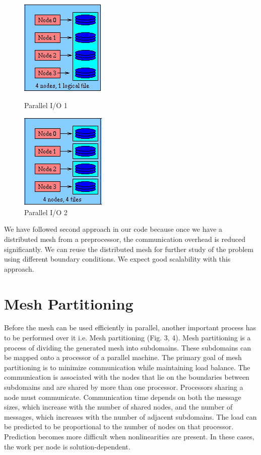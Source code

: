 \documentclass[a4paper, 11pt, oneside]{scrartcl}
\begin{document}
\begin{figure}[!htb]
\centering
{}
\centering
\includegraphics[]{./parallelio_0.png}
\caption{Parallel I/O 1 \cite{llnl}}
\endminipage\hfill
\centering
{}
\centering
\includegraphics[]{./parallelio_1.png}
\caption{Parallel I/O 2 \cite{llnl}}
\endminipage\hfill

\end{figure}

We have followed second approach in our code because once we have a distributed mesh from a preprocessor, the communication overhead is reduced significantly. We can reuse the distributed mesh for further study of the problem using different boundary conditions. We expect good scalability with this approach.

\section{Mesh Partitioning}
Before the mesh can be used efficiently in parallel, another important process has to be performed over it i.e. Mesh partitioning (Fig. 3, 4). Mesh partitioning is a process of dividing the generated mesh into subdomains. These subdomains can be mapped onto a processor of a parallel machine. The primary goal of mesh partitioning is to minimize communication while maintaining load balance. The communication is associated with the nodes that lie on the boundaries between subdomains and are shared by more than one processor. Processors sharing a node must communicate. Communication time depends on both the message sizes, which increase with the number of shared nodes, and the number of messages, which increases with the number of adjacent subdomains. The load can be predicted to be proportional to the number of nodes on that processor. Prediction becomes more difficult when nonlinearities are present. In these cases, the work per node is solution-dependent. 
\end{document}
